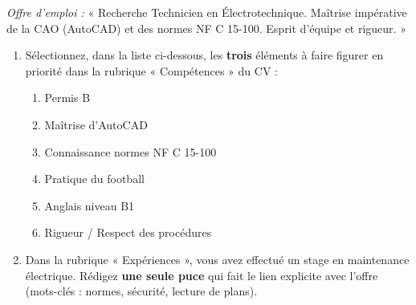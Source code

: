 \documentclass[11pt]{article}
\begin{document}
\begin{exercice}
\textit{Offre d'emploi :} « Recherche Technicien en Électrotechnique. Maîtrise impérative de la CAO (AutoCAD) et des normes NF C 15-100. Esprit d'équipe et rigueur. »
\begin{enumerate}
    \item Sélectionnez, dans la liste ci-dessous, les \textbf{trois} éléments à faire figurer en priorité dans la rubrique « Compétences » du CV :
    \begin{enumerate}[label=\alph*)]
        \item Permis B
        \item Maîtrise d'AutoCAD
        \item Connaissance normes NF C 15-100
        \item Pratique du football
        \item Anglais niveau B1
        \item Rigueur / Respect des procédures
    \end{enumerate}
    \item Dans la rubrique « Expériences », vous avez effectué un stage en maintenance électrique. Rédigez \textbf{une seule puce} qui fait le lien explicite avec l'offre (mots-clés : normes, sécurité, lecture de plans).
\end{enumerate}
\end{exercice}
\end{document}
